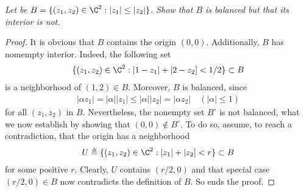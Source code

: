 \textit{Let be %
%
  $B = \{(z_{1}, z_{2}) \in \C^2: |z_{1}| \leq |z_{2}| \}$. %
%
Show that $B$ is balanced but that its interior is not.
}
%
\begin{proof}
It is obvious that $B$ contains the origin $(0,0)$. %
Additionally, $B$ has nomempty interior. Indeed, the following set %
%
\begin{align}
  \{(z_1, z_2) \in \C^2: |1- z_1| + |2- z_2] < 1/2 \} \subset B %
\end{align}
%
is a neighborhood of $(1, 2) \in B$. %
Moreover, $B$ is balanced, since
\begin{align}
  |\alpha z_1|  = |\alpha| |z_1| \leq  |\alpha| |z_2| = |\alpha z_2| %
  \quad (|\alpha| \leq 1)
\end{align}
%
for all $(z_1, z_2)$ in $B$. %
%
Nevertheless, the nonempty set $B^\circ$ is not balanced, what we now %
establish by showing that $(0, 0) \notin B^\circ$. %
%
To do so, assume, to reach a contradiction, %
that the origin has a neighborhood %
%
\begin{align}
  U \triangleq \{(z_1, z_2) \in \C^2: |z_1| + |z_2] < r \} \subset B %
\end{align}
%
for some positive $r$. Clearly, $U$ contains $(r/2, 0)$ %
and that special case $(r/2, 0) \in B$ now contradicts the definition of $B$. %
So ends the proof.
\end{proof}

